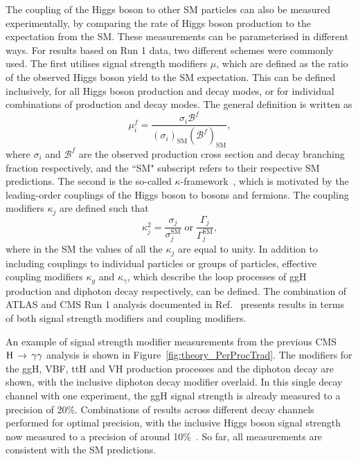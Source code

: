 The coupling of the Higgs boson to other SM particles can also be measured experimentally, 
by comparing the rate of Higgs boson production to the expectation from the SM.
These measurements can be parameterised in different ways.
For results based on Run 1 data, two different schemes were commonly used.
The first utilises signal strength modifiers $\mu$, 
which are defined as the ratio of the observed Higgs boson yield to the SM expectation.
This can be defined inclusively, for all Higgs boson production and decay modes, 
or for individual combinations of production and decay modes.
The general definition is written as
\begin{equation}
\mu^f_i = \frac{\sigma_i\mathcal{B}^f}{(\sigma_i)_{\textrm{SM}}(\mathcal{B}^f)_{\textrm{SM}}} ,
\end{equation}
where $\sigma_i$ and $\mathcal{B}^f$ are the observed production cross section 
and decay branching fraction respectively, 
and the ``SM" subscript refers to their respective SM predictions.
The second is the so-called $\kappa$-framework~\cite{YR3}, 
which is motivated by the leading-order couplings of the Higgs boson to bosons and fermions.
The coupling modifiers $\kappa_j$ are defined such that 
\begin{equation}
\kappa^2_j = \frac{\sigma_j}{\sigma_j^{\textrm{SM}}} \; \mathrm{or} \; \frac{\Gamma_j}{\Gamma_j^{\textrm{SM}}} ,
\end{equation}
where in the SM the values of all the $\kappa_j$ are equal to unity.
In addition to including couplings to individual particles or groups of particles, 
effective coupling modifiers $\kappa_g$ and $\kappa_\gamma$, 
which describe the loop processes of ggH production and diphoton decay respectively, can be defined.
The combination of ATLAS and CMS Run 1 analysis documented in Ref.~\cite{ATLASandCMScouplingsRun1} 
presents results in terms of both signal strength modifiers and coupling modifiers.

An example of signal strength modifier measurements 
from the previous CMS ${\mathrm{H}\,\rightarrow\,\gamma\gamma}$ analysis \cite{HIG-16-040} is shown in Figure~\ref{fig:theory_PerProcTrad}.
The modifiers for the ggH, VBF, ttH and VH production processes and the diphoton decay are shown, 
with the inclusive diphoton decay modifier overlaid.
In this single decay channel with one experiment, 
the ggH signal strength is already measured to a precision of 20\%.
Combinations of results across different decay channels performed for optimal precision,
with the inclusive Higgs boson signal strength now measured 
to a precision of around 10\%~\cite{ATLAScomb,CMScomb}.
So far, all measurements are consistent with the SM predictions.


